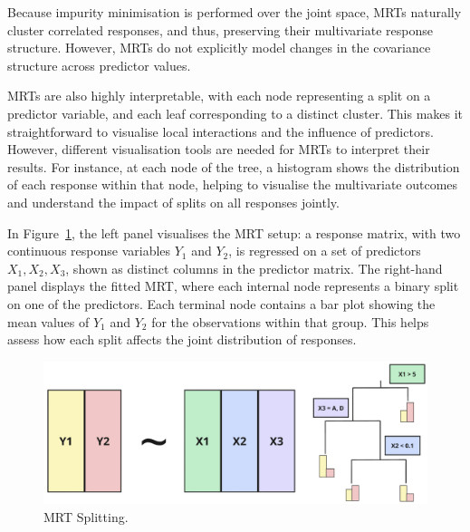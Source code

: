 \documentclass[11pt]{report} %
\begin{document}
Because impurity minimisation is performed over the joint space, MRTs naturally cluster correlated responses, and thus, preserving their multivariate response structure. However, MRTs do not explicitly model changes in the covariance structure across predictor values.

MRTs are also highly interpretable, with each node representing a split on a predictor variable, and each leaf corresponding to a distinct cluster. This makes it straightforward to visualise local interactions and the influence of predictors. However, different visualisation tools are needed for MRTs to interpret their results. For instance, at each node of the tree, a histogram shows the distribution of each response within that node, helping to visualise the multivariate outcomes and understand the impact of splits on all responses jointly.\cite{questier2005cart} 

In Figure~\ref{fig:MRT}, the left panel visualises the MRT setup: a response matrix, with two continuous response variables \( Y_1 \) and \( Y_2 \), is regressed on a set of predictors \( X_1, X_2, X_3 \), shown as distinct columns in the predictor matrix. The right-hand panel displays the fitted MRT, where each internal node represents a binary split on one of the predictors. Each terminal node contains a bar plot showing the mean values of \( Y_1 \) and \( Y_2 \) for the observations within that group. This helps assess how each split affects the joint distribution of responses. %


\begin{figure}[H]
    \centering
    \includegraphics[width=0.8\linewidth]{Images/MRT Image.png}
    \caption{MRT Splitting.\cite{qcbs_workshop}}
    \label{fig:MRT}
\end{figure}
\end{document}
